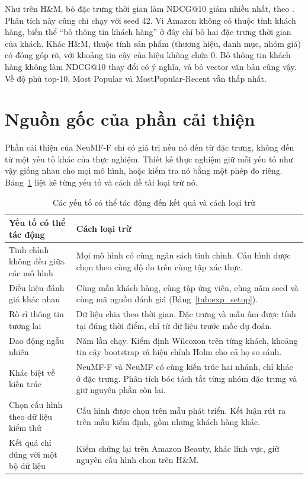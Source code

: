 Như trên H\&M, bỏ đặc trưng thời gian làm NDCG@10 giảm nhiều nhất, theo . Phân tích này cũng chỉ chạy với seed 42. Vì Amazon không có thuộc tính khách hàng, biến thể ``bỏ thông tin khách hàng'' ở đây chỉ bỏ hai đặc trưng thời gian của khách. Khác H\&M, thuộc tính sản phẩm (thương hiệu, danh mục, nhóm giá) có đóng góp rõ, với khoảng tin cậy của hiệu không chứa 0. Bỏ thông tin khách hàng không làm NDCG@10 thay đổi có ý nghĩa, và bỏ vector văn bản cũng vậy. Về độ phủ top-10, Most Popular và MostPopular-Recent vẫn thấp nhất.


\section{Nguồn gốc của phần cải thiện}
\label{sec:nguon_goc}

Phần cải thiện của NeuMF-F chỉ có giá trị nếu nó đến từ đặc trưng, không đến từ một yếu tố khác của thực nghiệm. Thiết kế thực nghiệm giữ mỗi yếu tố như vậy giống nhau cho mọi mô hình, hoặc kiểm tra nó bằng một phép đo riêng. Bảng~\ref{tab:loai_tru} liệt kê từng yếu tố và cách đề tài loại trừ nó.

\begin{table}[H]
    \centering\small
    \caption{Các yếu tố có thể tác động đến kết quả và cách loại trừ}
    \label{tab:loai_tru}
    \begin{tabularx}{\textwidth}{|>{\raggedright\arraybackslash}p{4.2cm}|>{\raggedright\arraybackslash}X|}
        \hline
        Yếu tố có thể tác động & Cách loại trừ \\
        \hline
        Tinh chỉnh không đều giữa các mô hình & Mọi mô hình có cùng ngân sách tinh chỉnh. Cấu hình được chọn theo cùng độ đo trên cùng tập xác thực. \\ \hline
        Điều kiện đánh giá khác nhau & Cùng mẫu khách hàng, cùng tập ứng viên, cùng năm seed và cùng mã nguồn đánh giá (Bảng~\ref{tab:exp_setup}). \\ \hline
        Rò rỉ thông tin tương lai & Dữ liệu chia theo thời gian. Đặc trưng và mẫu âm được tính tại đúng thời điểm, chỉ từ dữ liệu trước mốc dự đoán. \\ \hline
        Dao động ngẫu nhiên & Năm lần chạy. Kiểm định Wilcoxon trên từng khách, khoảng tin cậy bootstrap và hiệu chỉnh Holm cho cả họ so sánh. \\ \hline
        Khác biệt về kiến trúc & NeuMF-F và NeuMF có cùng kiến trúc hai nhánh, chỉ khác ở đặc trưng. Phân tích bóc tách tắt từng nhóm đặc trưng và giữ nguyên phần còn lại. \\ \hline
        Chọn cấu hình theo dữ liệu kiểm thử & Cấu hình được chọn trên mẫu phát triển. Kết luận rút ra trên mẫu kiểm định, gồm những khách hàng khác. \\ \hline
        Kết quả chỉ đúng với một bộ dữ liệu & Kiểm chứng lại trên Amazon Beauty, khác lĩnh vực, giữ nguyên cấu hình chọn trên H\&M. \\
        \hline
    \end{tabularx}
\end{table}


